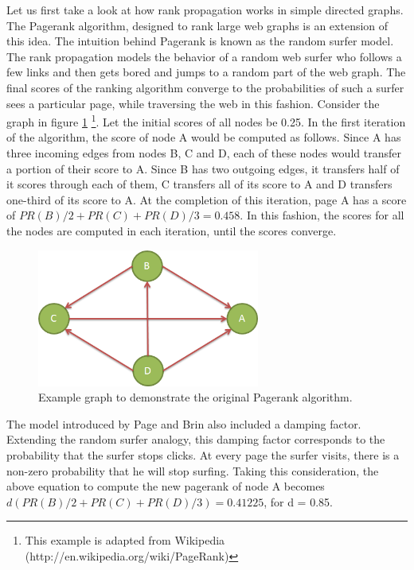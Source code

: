 Let us first take a look at how rank propagation works in simple directed graphs. The Pagerank \cite{page1999pagerank} algorithm, designed to rank large web graphs is an extension of this idea. The intuition behind Pagerank is known as the random surfer model. The rank propagation models the behavior of a random web surfer who follows a few links and then gets bored and jumps to a random part of the web graph. The final scores of the ranking algorithm converge to the probabilities of such a surfer sees a particular page, while traversing the web in this fashion. Consider the graph in figure \ref{fig:pr-graph-example} \footnote{This example is adapted from Wikipedia (http://en.wikipedia.org/wiki/PageRank)}. Let the initial scores of all nodes be 0.25. In the first iteration of the algorithm, the score of node A would be computed as follows. Since A has three incoming edges from nodes B, C and D, each of these nodes would transfer a portion of their score to A. Since B has two outgoing edges, it transfers half of it scores through each of them, C transfers all of its score to A and D transfers one-third of its score to A. At the completion of this iteration, page A has a score of $PR(B)/2 + PR(C) + PR(D)/3 = 0.458$. In this fashion, the scores for all the nodes are computed in each iteration, until the scores converge.

\begin{figure}[t]
\centering
\includegraphics[width=0.65\textwidth]{media/chapter6/pr-example-graph.png}
\caption{Example graph to demonstrate the original Pagerank algorithm.}
\label{fig:pr-graph-example}
\end{figure}

The model introduced by Page and Brin also included a damping factor. Extending the random surfer analogy, this damping factor corresponds to the probability that the surfer stops clicks. At every page the surfer visits, there is a non-zero probability that he will stop surfing. Taking this consideration, the above equation to compute the new pagerank of node A becomes $d(PR(B)/2 + PR(C) + PR(D)/3) = 0.41225$, for d = 0.85. 


